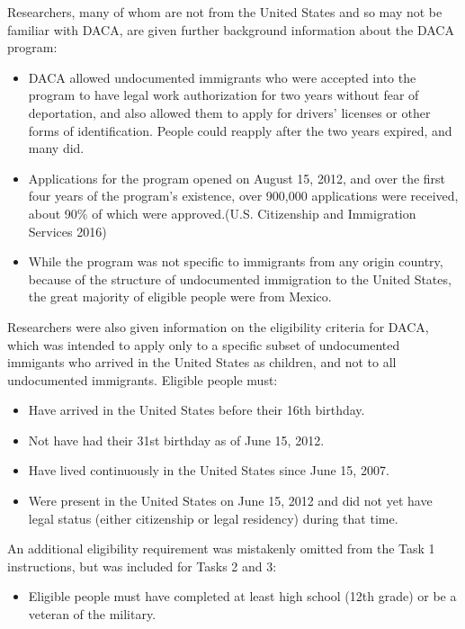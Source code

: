 \documentclass[
  letterpaper,
  DIV=11,
  numbers=noendperiod]{scrartcl}
\providecommand{\tightlist}{%
  \setlength{\itemsep}{0pt}\setlength{\parskip}{0pt}}\usepackage{longtable,booktabs,array}
\begin{document}
Researchers, many of whom are not from the United States and so may not
be familiar with DACA, are given further background information about
the DACA program:

\begin{itemize}
\item
  DACA allowed undocumented immigrants who were accepted into the
  program to have legal work authorization for two years without fear of
  deportation, and also allowed them to apply for drivers' licenses or
  other forms of identification. People could reapply after the two
  years expired, and many did.
\item
  Applications for the program opened on August 15, 2012, and over the
  first four years of the program's existence, over 900,000 applications
  were received, about 90\% of which were approved.(U.S. Citizenship and
  Immigration Services 2016)
\item
  While the program was not specific to immigrants from any origin
  country, because of the structure of undocumented immigration to the
  United States, the great majority of eligible people were from Mexico.
\end{itemize}

Researchers were also given information on the eligibility criteria for
DACA, which was intended to apply only to a specific subset of
undocumented immigants who arrived in the United States as children, and
not to all undocumented immigrants. Eligible people must:

\begin{itemize}
\item
  Have arrived in the United States before their 16th birthday.
\item
  Not have had their 31st birthday as of June 15, 2012.
\item
  Have lived continuously in the United States since June 15, 2007.
\item
  Were present in the United States on June 15, 2012 and did not yet
  have legal status (either citizenship or legal residency) during that
  time.
\end{itemize}

An additional eligibility requirement was mistakenly omitted from the
Task 1 instructions, but was included for Tasks 2 and 3:

\begin{itemize}
\tightlist
\item
  Eligible people must have completed at least high school (12th grade)
  or be a veteran of the military.
\end{itemize}
\end{document}
